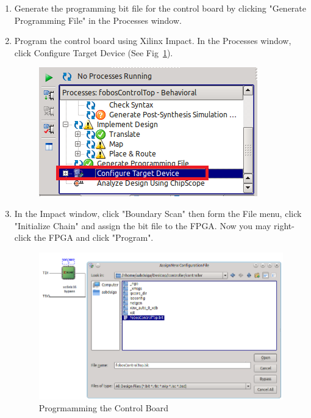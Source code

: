 \begin{enumerate}
\begin{figure}
		\vspace{-1ex}
		\end{figure}
  \item Generate the programming bit file for the control board by clicking "Generate Programming File" in the Processes window.
  \item Program the control board using Xilinx Impact. In the Processes window, click Configure Target Device (See Fig~\ref{fig:ctrl-run-impact}).
		\begin{figure} 
		\begin{center}
		\includegraphics[scale=0.6]{figures/ctrl-run-impact}
		\caption{\label{fig:ctrl-run-impact}}
		\end{center}
		\vspace{-1ex}
		\end{figure}
  \item In the Impact window, click "Boundary Scan" then form the File menu, click "Initialize Chain" and assign the bit file to the FPGA. Now you may right-click the FPGA and click "Program".
		\begin{figure} 
		\begin{center}
		\includegraphics[scale=0.6]{figures/ctrl-program}
		\caption{\label{fig:ctrl-program}Progrmamming the Control Board}
		\end{center}
		\vspace{-1ex}
		\end{figure}
  \end{enumerate}

